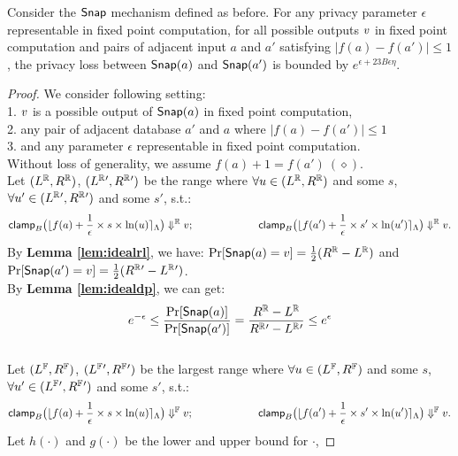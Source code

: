 \documentclass[a4paper,11pt]{article}
\begin{document}
\begin{thm}
%
Consider the $\mathsf{Snap}$ mechanism defined as before. For any privacy parameter $\epsilon$ representable in fixed point computation, for all possible outputs $v$ in fixed point computation and pairs of adjacent input $a$ and $a'$ satisfying $|f(a) - f(a')| \leq 1$, the privacy loss between $\mathsf{Snap}(a)$ and $\mathsf{Snap}(a')$ is bounded by $e^{\epsilon + 23 B \epsilon \eta}$.
\end{thm}

\begin{proof}
%
%
We consider following setting:
\\
1. $v$ is a possible output of $\mathsf{Snap}(a)$ in fixed point computation,
%
\\
2. any pair of adjacent database $a'$ and $a$ where $|f(a) - f(a')| \leq 1$
%
\\
3. and any parameter $\epsilon$ representable in fixed point computation.
%
\\
Without loss of generality, we assume $f(a) + 1 = f(a') ~ (\diamond)$.
%
\\
%
%
Let $(L^{\mathbb{R}}, R^{\mathbb{R}})$, $(L^{\mathbb{R}}{'}, R^{\mathbb{R}}{'})$ be the range where 
$\forall u \in (L^{\mathbb{R}}, R^{\mathbb{R}})$ and some $s$, 
$\forall u' \in (L^{\mathbb{R}}{'}, R^{\mathbb{R}}{'})$ and some $s'$, s.t.:
%
$$\mathsf{clamp}_B \big(
	\lfloor f(a) + \frac{1}{\epsilon} \times s \times \ln (u) \rceil_{\Lambda}
	\big)
	 \Downarrow^{\mathbb{R}} v; 
~~~~~~~~~~~~~~~~~~
\mathsf{clamp}_B \big(
	\lfloor f(a') + \frac{1}{\epsilon} \times s' \times \ln (u') \rceil_{\Lambda}
	\big)
	 \Downarrow^{\mathbb{R}} v.$$
%
By \textbf{Lemma \ref{lem:idealrl}}, we have:
$\Pr[\mathsf{Snap}(a) = v] = \frac{1}{2} (R^{\mathbb{R}} - L^{\mathbb{R}})$ 
and $\Pr[\mathsf{Snap}(a') = v] = \frac{1}{2} (R^{\mathbb{R}}{'} - L^{\mathbb{R}}{'})$.
%
\\
%
By \textbf{Lemma \ref{lem:idealdp}}, we can get:
\[
	e^{-\epsilon} \leq \frac{\Pr[\mathsf{Snap}(a)]}{\Pr[\mathsf{Snap}(a')]}
	= \frac{R^{\mathbb{R}} - L^{\mathbb{R}}}{R^{\mathbb{R}}{'} - L^{\mathbb{R}}{'}} \leq e^{\epsilon}
\]
%
\\
%
Let $(L^{\mathbb{F}}, R^{\mathbb{F}})$, $(L^{\mathbb{F}}{'}, R^{\mathbb{F}}{'})$ be the largest range where 
$\forall u \in (L^{\mathbb{F}}, R^{\mathbb{F}})$ and some $s$, 
$\forall u' \in (L^{\mathbb{F}}{'}, R^{\mathbb{F}}{'})$ and some $s'$, s.t.:
%
$$
\mathsf{clamp}_B \big(
	\lfloor f(a) + \frac{1}{\epsilon} \times s \times \ln (u) \rceil_{\Lambda}
	\big)
	\Downarrow^{\mathbb{F}} v; 
~~~~~~~~~~~~~~~~~~
\mathsf{clamp}_B \big(
	\lfloor f(a') + \frac{1}{\epsilon} \times s' \times \ln (u') \rceil_{\Lambda}
	\big)
	\Downarrow^{\mathbb{F}} v.$$
%
Let $h{(\cdot) }$ and $g(\cdot)$
be the lower and upper bound for $\cdot$,

\end{proof}
\end{document}
